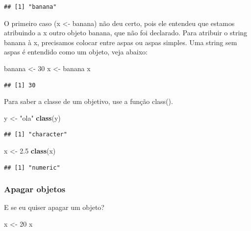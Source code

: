 \documentclass[
]{book}
\newenvironment{Shaded}{\begin{snugshade}}{\end{snugshade}}
\newcommand{\DecValTok}[1]{\textcolor[rgb]{0.00,0.00,0.81}{#1}}
\newcommand{\FloatTok}[1]{\textcolor[rgb]{0.00,0.00,0.81}{#1}}
\newcommand{\KeywordTok}[1]{\textcolor[rgb]{0.13,0.29,0.53}{\textbf{#1}}}
\newcommand{\NormalTok}[1]{#1}
\newcommand{\StringTok}[1]{\textcolor[rgb]{0.31,0.60,0.02}{#1}}
\begin{document}
\begin{verbatim}
## [1] "banana"
\end{verbatim}

O primeiro caso (x \textless- banana) não deu certo, pois ele entendeu que estamos atribuindo a x outro objeto banana, que não foi declarado. Para atribuir o string banana à x, precisamos colocar entre aspas ou aspas simples. Uma string sem aspas é entendido como um objeto, veja abaixo:

\begin{Shaded}
\begin{Highlighting}[]
\NormalTok{banana <-}\StringTok{ }\DecValTok{30}
\NormalTok{x <-}\StringTok{ }\NormalTok{banana}
\NormalTok{x}
\end{Highlighting}
\end{Shaded}

\begin{verbatim}
## [1] 30
\end{verbatim}

Para saber a classe de um objetivo, use a função class().

\begin{Shaded}
\begin{Highlighting}[]
\NormalTok{y <-}\StringTok{ "ola"}
\KeywordTok{class}\NormalTok{(y)}
\end{Highlighting}
\end{Shaded}

\begin{verbatim}
## [1] "character"
\end{verbatim}

\begin{Shaded}
\begin{Highlighting}[]
\NormalTok{x <-}\StringTok{ }\FloatTok{2.5}
\KeywordTok{class}\NormalTok{(x)}
\end{Highlighting}
\end{Shaded}

\begin{verbatim}
## [1] "numeric"
\end{verbatim}

\hypertarget{apagar-objetos}{%
\subsubsection{Apagar objetos}\label{apagar-objetos}}

E se eu quiser apagar um objeto?

\begin{Shaded}
\begin{Highlighting}[]
\NormalTok{x <-}\StringTok{ }\DecValTok{20}
\NormalTok{x}
\end{Highlighting}
\end{Shaded}
\end{document}
